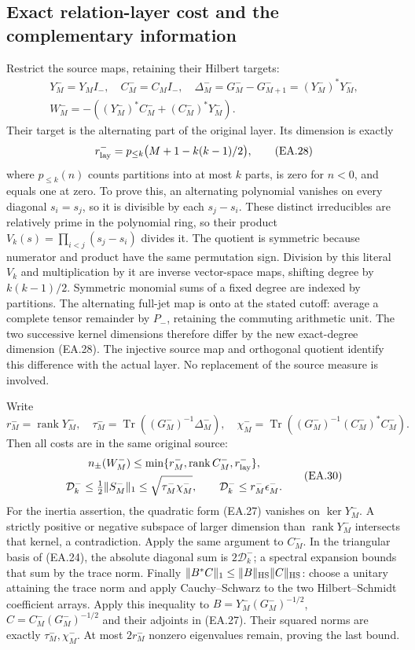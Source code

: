 \subsection{Exact relation-layer cost and the complementary information}

Restrict the source maps, retaining their Hilbert targets:
\[
 \begin{gathered}
 Y_M^-=Y_MI_-,\quad C_M^-=C_MI_-,\quad
 \Delta_M^-=G_M^--G_{M+1}^-=(Y_M^-)^*Y_M^-,\\
 W_M^-=-((Y_M^-)^*C_M^-+(C_M^-)^*Y_M^-).
 \end{gathered}\tag{EA.27}
\]
Their target is the alternating part of the original layer.  Its
dimension is exactly
\[
 r_{\rm lay}^-=p_{\le k}\bigl(M+1-k(k-1)/2\bigr),
 \tag{EA.28}
\]
where \(p_{\le k}(n)\) counts partitions into at most \(k\)
parts, is zero for \(n<0\), and equals one at zero.
To prove this, an alternating polynomial vanishes on every diagonal
\(s_i=s_j\), so it is divisible by each \(s_j-s_i\).  These
distinct irreducibles are relatively prime in the polynomial ring,
so their product
\(V_k(s)=\prod_{i<j}(s_j-s_i)\) divides it.  The quotient is
symmetric because numerator and product have the same permutation
sign.  Division by this literal \(V_k\) and multiplication by it
are inverse vector-space maps, shifting degree by \(k(k-1)/2\).
Symmetric monomial sums of a fixed degree are indexed by partitions.
The alternating full-jet map is onto at the stated cutoff: average a
complete tensor remainder by \(P_-\), retaining the commuting
arithmetic unit.  The two successive kernel dimensions therefore
differ by the new exact-degree dimension (EA.28).  The injective
source map and orthogonal quotient identify this difference with the
actual layer.  No replacement of the source measure is involved.

Write
\[
 r_M^-=\operatorname{rank}Y_M^-,\quad
 \tau_M^-=\operatorname{Tr}((G_M^-)^{-1}\Delta_M^-),\quad
 \chi_M^-=\operatorname{Tr}((G_M^-)^{-1}(C_M^-)^*C_M^-).
 \tag{EA.29}
\]
Then all costs are in the same original source:
\[
 \begin{gathered}
 n_\pm(W_M^-)\le
    \min\{r_M^-,\operatorname{rank}C_M^-,r_{\rm lay}^-\},\\
 \mathcal D_k^-\le\tfrac12\|S_M^-\|_1
                 \le\sqrt{\tau_M^-\chi_M^-},\qquad
 \mathcal D_k^-\le r_M^-\epsilon_M^-.
 \end{gathered}\tag{EA.30}
\]
For the inertia assertion, the quadratic form (EA.27) vanishes on
\(\ker Y_M^-\).  A strictly positive or negative subspace of
larger dimension than \(\operatorname{rank}Y_M^-\) intersects
that kernel, a contradiction.  Apply the same argument to \(C_M^-\).
In the triangular basis of (EA.24), the absolute diagonal sum is
\(2\mathcal D_k^-\); a spectral expansion bounds that sum by
the trace norm.  Finally
\(\|B^*C\|_1\le\|B\|_{\rm HS}\|C\|_{\rm HS}\): choose
a unitary attaining the trace norm and apply Cauchy--Schwarz to the
two Hilbert--Schmidt coefficient arrays.  Apply this inequality to
\(B=Y_M^-(G_M^-)^{-1/2}\), \(C=C_M^-(G_M^-)^{-1/2}\)
and their adjoints in (EA.27).  Their squared norms are exactly
\(\tau_M^-,\chi_M^-\).  At most \(2r_M^-\) nonzero
eigenvalues remain, proving the last bound.

